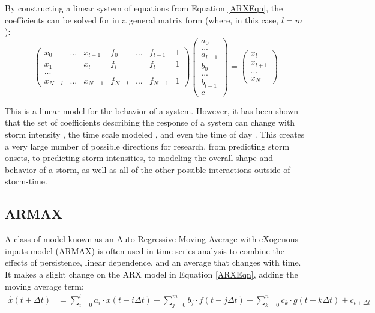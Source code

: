 By constructing a linear system of equations from Equation \ref{ARXEqn}, the coefficients can be solved for in a general matrix form (where, in this case, $l=m$):
\[
\left( \begin{array}{ccccccc}
x_0 & ... & x_{l-1} & f_0 & ... & f_{l-1} & 1\\
x_1 &     & x_l & f_l &  &f_l & 1\\
... &     &     &     &  &   & \\
x_{N-l} & ... & x_{N-1} & f_{N-l} & ... & f_{N-1} & 1
\end{array} \right)
\left(\begin{array}{c}
a_0\\...\\a_{l-1}\\b_0\\...\\b_{l-1}\\c
\end{array}\right)
=
\left(
\begin{array}{c}
x_l \\ x_{l+1} \\ ... \\ x_{N}
\end{array}
\right)
\]

This is a linear model for the behavior of a system. However, it has been shown that the set of coefficients describing the response of a system can change with storm intensity \cite{ARXEqn}, the time scale modeled \cite{Coupling}, and even the time of day \cite{VBzAL}. This creates a very large number of possible directions for research, from predicting storm onsets, to predicting storm intensities, to modeling the overall shape and behavior of a storm, as well as all of the other possible interactions outside of storm-time. 


\subsection{ARMAX}

A class of model known as an Auto-Regressive Moving Average with eXogenous inputs model (ARMAX) is often used in time series analysis to combine the effects of persistence, linear dependence, and an average that changes with time. It makes a slight change on the ARX model in Equation \ref{ARXEqn}, adding the moving average term:
\begin{align}
\hat{x}(t+\Delta t)&=\sum_{i=0}^la_i\cdot x(t-i\Delta t)+\sum_{j=0}^m b_j\cdot f(t-j\Delta t)+\sum_{k=0}^n c_k\cdot g(t-k\Delta t)+c_{t+\Delta t}
\label{ARMAXEqn}
\end{align}


